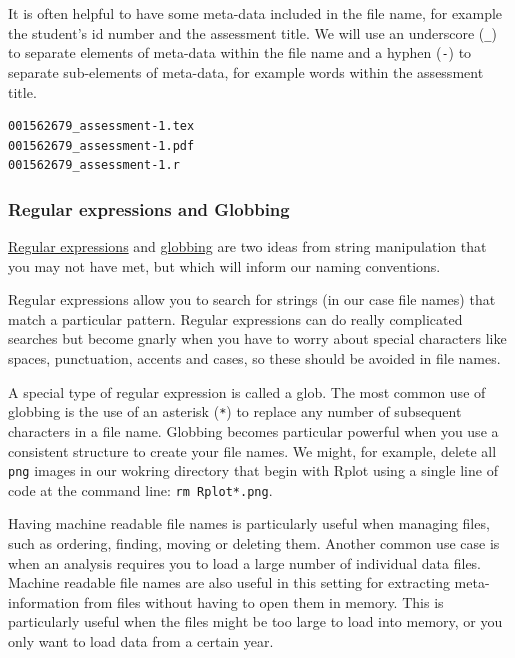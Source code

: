 \documentclass[
  letterpaper,
  DIV=11,
  numbers=noendperiod]{scrreprt}
\begin{document}
It is often helpful to have some meta-data included in the file name,
for example the student's id number and the assessment title. We will
use an underscore (\texttt{\_}) to separate elements of meta-data within
the file name and a hyphen (\texttt{-}) to separate sub-elements of
meta-data, for example words within the assessment title.

\begin{verbatim}
001562679_assessment-1.tex
001562679_assessment-1.pdf
001562679_assessment-1.r
\end{verbatim}

\subsubsection{Regular expressions and
Globbing}\label{regular-expressions-and-globbing}

\href{https://cran.r-project.org/web/packages/stringr/vignettes/regular-expressions.html}{Regular
expressions} and
\href{https://en.wikipedia.org/wiki/Glob_(programming)}{globbing} are
two ideas from string manipulation that you may not have met, but which
will inform our naming conventions.

Regular expressions allow you to search for strings (in our case file
names) that match a particular pattern. Regular expressions can do
really complicated searches but become gnarly when you have to worry
about special characters like spaces, punctuation, accents and cases, so
these should be avoided in file names.

A special type of regular expression is called a glob. The most common
use of globbing is the use of an asterisk (\texttt{*}) to replace any
number of subsequent characters in a file name. Globbing becomes
particular powerful when you use a consistent structure to create your
file names. We might, for example, delete all \texttt{png} images in our
wokring directory that begin with Rplot using a single line of code at
the command line: \texttt{rm\ Rplot*.png}.

Having machine readable file names is particularly useful when managing
files, such as ordering, finding, moving or deleting them. Another
common use case is when an analysis requires you to load a large number
of individual data files. Machine readable file names are also useful in
this setting for extracting meta-information from files without having
to open them in memory. This is particularly useful when the files might
be too large to load into memory, or you only want to load data from a
certain year.
\end{document}
